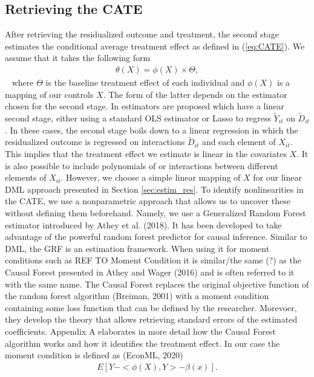 \subsection{Retrieving the CATE}
After retrieving the residualized outcome and treatment, the second stage estimates the conditional average treatment effect as defined in (\ref{eq:CATE}). We assume that it takes the following form
\begin{align} 
    \theta(X)=\phi(X) \times \Theta, \label{eq:CATE}
\end{align} 
where $\Theta$ is the baseline treatment effect of each individual and $\phi(X)$ is a mapping of our controls $X$. The form of the latter depends on the estimator chosen for the second stage. In \cite{DML2017} estimators are proposed which have a linear second stage, either using a standard OLS estimator or Lasso to regress $\tilde{Y}_{it}$ on $\tilde{D}_{it}$. In these cases, the second stage boils down to a linear regression in which the residualized outcome is regressed on interactions $\tilde{D}_{it}$ and each element of $X_{it}$. This implies that the treatment effect we estimate is linear in the covariates $X$. It is also possible to include polynomials of or interactions between different elements of $X_{it}$. However, we choose a simple linear mapping of $X$ for our linear DML approach presented in Section \ref{sec:estim_res}. To identify nonlinearities in the CATE, we use a nonparametric approach that allows us to uncover these without defining them beforehand. Namely, we use a Generalized Random Forest estimator introduced by Athey et al. (2018). It has been developed to take advantage of the powerful random forest predictor for causal inference. Similar to DML, the GRF is an estimation framework. When using it for moment conditions such as REF TO Moment Condition it is similar/the same (?) as the Causal Forest presented in Athey and Wager (2016) and is often referred to it with the same name. The Causal Forest replaces the original objective function of the random forest algorithm (Breiman, 2001) with a moment condition containing some loss function that can be defined by the researcher. Morevoer, they develop the theory that allows retrieving standard errors of the estimated coefficients. Appendix A elaborates in more detail how the Causal Forest algorithm works and how it identifies the treatment effect. In our case the moment condition is defined as (EconML, 2020)
\begin{align*}
    E \left[Y- <\phi(X), Y> - \beta(x) \right].
\end{align*}
